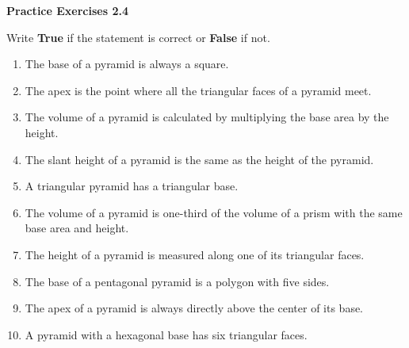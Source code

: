 \noindent\textbf{Practice Exercises 2.4}

\vspace{0.75ex}

Write \textbf{True} if the statement is correct or \textbf{False} if not.
\begin{enumerate}[noitemsep, label = \color{blue}\arabic*. ]
    \item The base of a pyramid is always a square.
    \item The apex is the point where all the triangular faces of a pyramid meet.
    \item The volume of a pyramid is calculated by multiplying the base area by the height.
    \item The slant height of a pyramid is the same as the height of the pyramid.
    \item A triangular pyramid has a triangular base.
    \item The volume of a pyramid is one-third of the volume of a prism with the same base area and height.
    \item The height of a pyramid is measured along one of its triangular faces.
    \item The base of a pentagonal pyramid is a polygon with five sides.
    \item The apex of a pyramid is always directly above the center of its base.
    \item A pyramid with a hexagonal base has six triangular faces.
\end{enumerate}


